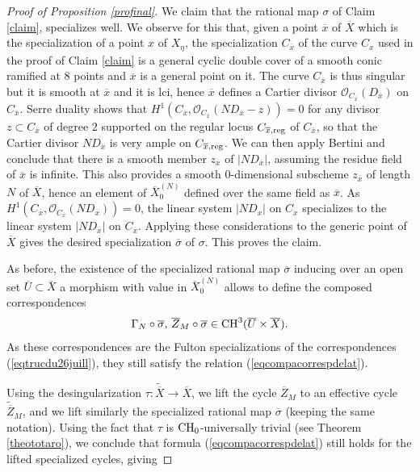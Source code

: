 \documentclass[10pt]{article}
\begin{document}
\begin{proof}[Proof of Proposition \ref{profinal}]
We  claim that   the rational map $\sigma$  of Claim \ref{claim}, specializes  well. We observe for this that, given a point $\overline{x}$ of $\overline{X}$ which is the specialization of a point $x$ of $X_\eta$, the specialization $C_{\overline{x}}$ of the  curve $C_x$   used in the proof of   Claim \ref{claim}  is a general cyclic double cover of a smooth conic ramified at $8$ points and $\overline{x}$ is a general point on it. The curve $C_{\overline{x}}$ is thus singular but it is smooth at $\overline{x}$ and it is  lci, hence  $\overline{x}$ defines  a Cartier divisor $\mathcal{O}_{C_{\overline{x}}}(D_{\overline{x}})$ on $C_{\overline{x}}$.   Serre duality shows that  $H^1(C_{\overline{x}},\mathcal{O}_{C_{\overline{x}}}(ND_{\overline{x}}-z))=0$ for any divisor $z\subset C_{\overline{x}}$ of degree $2$ supported on the regular locus $C_{\overline{x},{\rm reg}}$ of $C_{\overline{x}}$, so that the Cartier divisor $ND_{\overline{x}}$ is very ample on $C_{\overline{x},{\rm reg}}$.  We can then apply Bertini and conclude that there is a smooth member $z_{\overline{x}}$ of $|ND_{\overline{x}}|$, assuming the residue field of $\overline{x}$ is infinite. This also provides a smooth $0$-dimensional subscheme $z_{\overline{x}}$ of length $N$  of $\overline{X}$, hence an element of $\overline{X}^{(N)}_0$ defined over the same field as $\overline{x}$.  As $H^1(C_{\overline{x}},\mathcal{O}_{C_{\overline{x}}}(ND_{\overline{x}}))=0$, the linear system $|ND_x|$ on $C_x$ specializes to the  linear system $|ND_{\overline{x}}|$ on $C_{\overline{x}}$.
Applying these considerations to the generic point  of $\overline{X}$ gives the desired specialization $\overline{\sigma}$ of $\sigma$. This proves the claim.

As before, the existence of the specialized rational map $\overline{\sigma}$ inducing over an open set $\overline{U}\subset \overline{X}$ a morphism with value in $\overline{X}^{(N)}_0$ allows to define
the composed correspondences
$$\Gamma_N\circ \overline{\sigma},\, \overline{Z}_M\circ\overline{\sigma}\in {\rm CH}^3(\overline{U}\times \overline{X}).$$
As these correspondences are the Fulton specializations of the correspondences  (\ref{eqtrucdu26juill}), they  still satisfy the relation (\ref{eqcompacorrespdelat}).

 Using the  desingularization $\tau:\widetilde{\overline{X}}\rightarrow \overline{X}$, we lift the cycle $\overline{Z}_M$ to an effective cycle  $  \widetilde{\overline{Z}}_M$, and we lift similarly the specialized  rational map $\overline{\sigma}$ (keeping the same notation).  Using the fact that $\tau$ is ${\rm CH}_0$-universally trivial (see Theorem \ref{theototaro}), we conclude that formula (\ref{eqcompacorrespdelat}) still holds for the lifted specialized cycles, giving



\end{proof}
\end{document}
